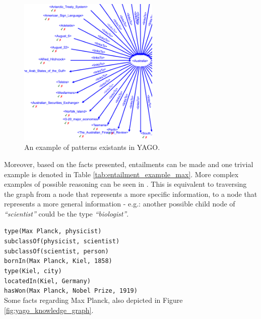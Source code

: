 \documentclass[11pt,a4paper,openright]{memoir}
\begin{document}
\begin{figure}[!htbp]
  \centering
    \includegraphics[width=0.6\textwidth]{./images/yago}
  \caption[An example of patterns existants in YAGO.]{An example of patterns existants in YAGO.}
  \label{fig:yago_examples}
\end{figure}

Moreover, based on the facts presented, entailments can be made and one trivial example is denoted in Table \ref{tab:entailment_example_max}. More complex examples of possible reasoning can be seen in \cite{Surdeanu:2011:CIE:2021153.2021155}. This is equivalent to traversing the graph from a node that represents a more specific information, to a node that represents a more general information - e.g.: another possible child node of \emph{\enquote{scientist}} could be the type \emph{\enquote{biologist}}.

\begin{table}[!htbp]
  \centering
  \RaggedRight
    \texttt{type(Max Planck, physicist)} \\
    \texttt{subclassOf(physicist, scientist)} \\
    \texttt{subclassOf(scientist, person)} \\
    \texttt{bornIn(Max Planck, Kiel, 1858)} \\
    \texttt{type(Kiel, city)} \\
    \texttt{locatedIn(Kiel, Germany)} \\
    \texttt{hasWon(Max Planck, Nobel Prize, 1919)} \\
  \caption[Some facts regarding Max Planck.]{Some facts regarding Max Planck, also depicted in Figure \ref{fig:yago_knowledge_graph}.}
  \label{tab:max_planck}
\end{table}
\end{document}
